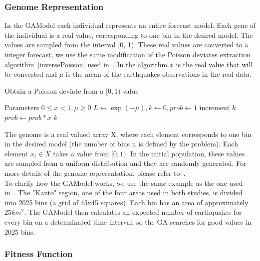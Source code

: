 \subsubsection{Genome Representation}\label{genomeGA}
In the GAModel each individual represents an entire forecast model. Each gene of the individual is a real value, corresponding to one bin in the desired model. The values are sampled from the interval [0, 1). These real values are converted to a integer forecast, we use the same modification of the Poisson deviates extraction algorithm~\ref{inversePoisson} used in~\cite{ecta14}. In the algorithm $x$ is the real value that will be converted and $\mu$ is the mean of the earthquakes observations in the real data. \\

\begin{algorithm}\label{inversePoisson}
  \caption{Obtain a Poisson deviate from a $[0,1)$ value}
  \label{InversePoisson}
  \begin{algorithmic}
    \STATE Parameters $0 \leq x < 1, \mu \geq 0$
    \STATE $L \gets \exp{(-\mu)}, k \gets 0, prob \gets 1$
    \REPEAT 
    \STATE $\text{increment }k$
    \STATE $prob \gets prob*x$
    \RETURN $k$
  \end{algorithmic}
\end{algorithm}

The genome is a real valued array X, where each element corresponds to one bin in the desired model (the number of bins n is defined by the problem). Each element $x_i \in X$ takes a value from $[0,1)$. In the initial population, these values are sampled from a uniform distribution and they are randomly generated. For more details of the genome representation, please refer to~\cite{ecta14}.\\


To clarify how the GAModel works, we use the same example as the one used in~\cite{ecta14}. The "Kanto" region, one of the four areas used in both studies, is divided into 2025 bins (a grid of 45x45 squares). Each bin has an area of approximately $25km^2$. The GAModel then calculates an expected number of earthquakes for every bin on a determinated time interval, so the GA searches for good values in 2025 bins.\\
\subsubsection{Fitness Function}\label{fitGA}

